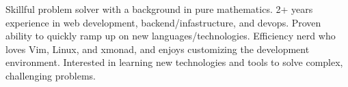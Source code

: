 

\begin{cvparagraph}

Skillful problem solver with a background in pure mathematics.
2+ years experience in web development, backend/infastructure, and devops.
Proven ability to quickly ramp up on new languages/technologies.
Efficiency nerd who loves Vim, Linux, and xmonad, and enjoys customizing the development environment.
Interested in learning new technologies and tools to solve complex, challenging problems.
\end{cvparagraph}

